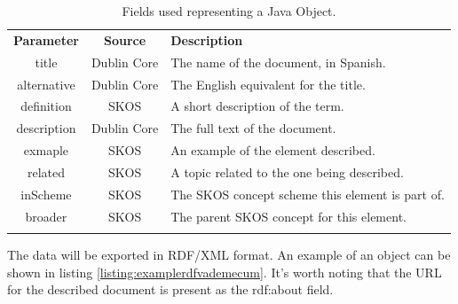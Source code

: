 \begin{center}
  \begin{table}
    \begin{tabular*}{0.7\textwidth}{@{\extracolsep{\fill}} | c | c | p{} |}
      \hhline{|-|-|-|}
      \textbf{Parameter} & \textbf{Source} & \textbf{Description} \\ \hhline{|=|=|=|}
      title & Dublin Core &  The name of the document, in Spanish. \\ \hhline{|-|-|-|}
      alternative & Dublin Core & The English equivalent for the title. \\ \hhline{|-|-|-|}
      definition & SKOS & A short description of the term.  \\ \hhline{|-|-|-|}
      description & Dublin Core & The full text of the document.  \\ \hhline{|-|-|-|}
      exmaple & SKOS & An example of the element described.  \\ \hhline{|-|-|-|}
      related & SKOS & A topic related to the one being described. \\ \hhline{|-|-|-|}
      inScheme & SKOS & The SKOS concept scheme this element is part of.  \\ \hhline{|-|-|-|}
      broader & SKOS & The parent SKOS concept for this element. \\ \hhline{|-|-|-|}
      \end{tabular*}
    \caption{Fields used representing a Java Object.}
    \label{tab:taxonomyfields}
  \end{table}
\end{center}

The data will be exported in RDF/XML format. An example of an object can be shown in listing \ref{listing:examplerdfvademecum}. It's worth noting that the URL for the described document is present as the rdf:about field.

